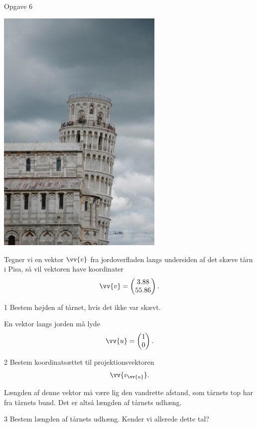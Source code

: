 \documentclass[12pt,x11names,a4paper]{article}
\begin{document}
\begin{opgavetekst}{Opgave 6}
	\begin{center}
		\includegraphics[width=0.6\textwidth]{Billeder/pisa}
	\end{center}
	Tegner vi en vektor $\vv{v}$ fra jordoverfladen langs undersiden af det skæve tårn i Pisa, så vil vektoren 
	have koordinater
	\begin{align*}
		\vv{v} = 
		\begin{pmatrix}
			3.88 \\
			55.86
		\end{pmatrix}.
	\end{align*}	 
\end{opgavetekst}
\begin{delopgave}{}{1}
	Bestem højden af tårnet, hvis det ikke var skævt. 
\end{delopgave}
\begin{meretekst}
	En vektor langs jorden må lyde 
	\begin{align*}
		\vv{u} = 
		\begin{pmatrix}
			1 \\ 0
		\end{pmatrix}.
	\end{align*}
\end{meretekst}
\begin{delopgave}{}{2}
	Bestem koordinatsættet til projektionsvektoren
	\begin{align*}
		\vv{v_{\vv{u}}}.
	\end{align*}
\end{delopgave}
\begin{meretekst}
	Længden af denne vektor må være lig den vandrette afstand, som tårnets top har fra tårnets bund. Det er 
	altså længden af tårnets udhæng.
\end{meretekst}
\begin{delopgave}{}{3}
	Bestem længden af tårnets udhæng. Kender vi allerede dette tal?
\end{delopgave}
\end{document}
